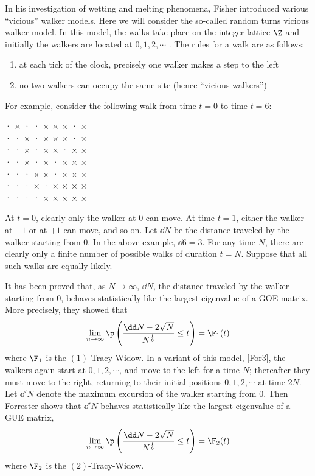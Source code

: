In his investigation of wetting and melting phenomena, Fisher introduced various “vicious” walker models. Here we will consider the so-called random turns vicious walker model. In this model, the walks take place on the integer lattice $\Z$ and initially the walkers are located at $0, 1, 2, \cdots$ . The rules for a walk are as follows:
\begin{enumerate}
	\item at each tick of the clock, precisely one walker makes a step to the left
	\item no two walkers can occupy the same site (hence “vicious walkers”)
\end{enumerate}
For example, consider the following walk from time $t = 0$ to time $t = 6$:
\begin{center}
	· × · · × × × · × \\
	· · × · × × × · × \\
	· · × · × × · × × \\
	· · × · × · × × × \\
	· · · × × · × × × \\
	· · · × · × × × × \\
	· · · · × × × × × \\
\end{center}
At $t = 0$, clearly only the walker at $0$ can move. At time $t = 1$, either the walker at $-1$ or at $+1$ can move, and so on. Let $\dd N$ be the distance traveled by the walker starting from $0$. In the above example, $\dd 6 = 3$. For any time $N$, there are clearly only a finite number of possible walks of duration $t = N$. Suppose that all such walks are equally likely.

It has been proved that, as $N \rightarrow \infty$, $\dd N$, the distance traveled by
the walker starting from $0$, behaves statistically like the largest eigenvalue of a GOE
matrix. More precisely, they showed that
\begin{equation}
	\lim_{n\rightarrow \infty} \p\left( \frac{\dd N - 2 \sqrt{N}}{N^{\frac{1}{6}}} \leq t \right) = \F_{1}(t)
\end{equation}
where $\F_1$ is the $(1)$-Tracy-Widow. In a variant of this model, [For3], the walkers again start at $0,1,2,\cdots$, and move to the left for a time $N$; thereafter they must move to the
right, returning to their initial positions $0,1,2,\cdots$ at time $2N$. Let $\dd'N$ denote the
maximum excursion of the walker starting from $0$. Then Forrester shows that $\dd'N$ behaves statistically like the largest eigenvalue of a GUE matrix,
\begin{equation}
	\lim_{n\rightarrow \infty} \p\left( \frac{\dd N - 2 \sqrt{N}}{N^{\frac{1}{6}}} \leq t \right) = \F_{2}(t)
\end{equation}
where $\F_2$ is the $(2)$-Tracy-Widow.
